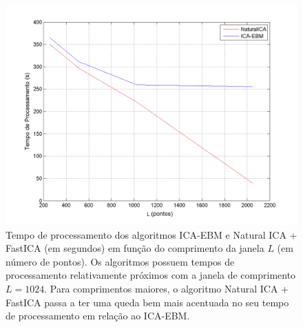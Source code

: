 \begin{figure}
    \centering
        \includegraphics[scale=0.5]{figuras/comparison_convergence_window.png}
            \caption{Tempo de processamento dos algoritmos ICA-EBM e Natural ICA + FastICA (em segundos) em função do comprimento da janela $L$ (em número de pontos). Os algoritmos possuem tempos de processamento relativamente próximos com a janela de comprimento $L=1024$. Para comprimentos maiores, o algoritmo Natural ICA + FastICA passa a ter uma queda bem mais acentuada no seu tempo de processamento em relação ao ICA-EBM.}
    \label{fig:comparison_convergence_window}
\end{figure}
